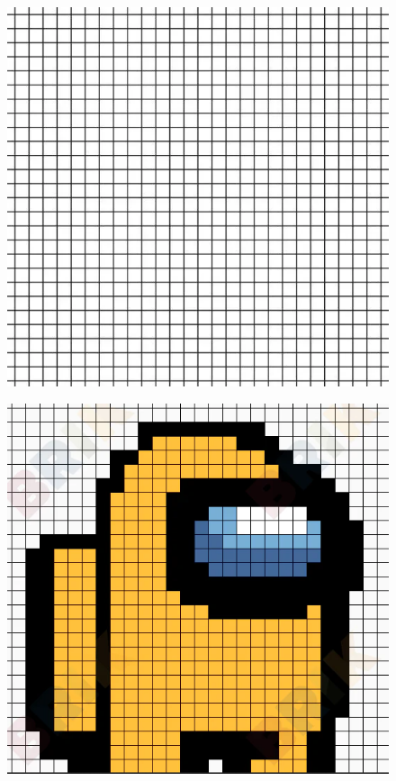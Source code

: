 \begin{minipage}[t]{0.50\textwidth}
\begin{figure}[H]
  \centering
  \includegraphics[width=0.8\linewidth]{6x4-geometrie-base/grille.png}
\end{figure}
\end{minipage}
\begin{minipage}[t]{0.50\textwidth}
  \begin{figure}[H]
    \centering
    \includegraphics[width=0.8\linewidth]{6x4-geometrie-base/pa.png}
  \end{figure}
\end{minipage}

